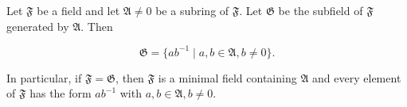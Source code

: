Let $\mathfrak{F}$ be a field and let $\mathfrak{A} \neq 0$ be a subring of $\mathfrak{F}$. Let $\mathfrak{G}$ be the subfield of $\mathfrak{F}$ generated by $\mathfrak{A}$. Then

$$\mathfrak{G} = \{ab^{-1} \mid a, b \in \mathfrak{A}, b \neq 0\}.$$

In particular, if $\mathfrak{F} = \mathfrak{G}$, then $\mathfrak{F}$ is a minimal field containing $\mathfrak{A}$ and every element of $\mathfrak{F}$ has the form $ab^{-1}$ with $a, b \in \mathfrak{A}, b \neq 0$.
